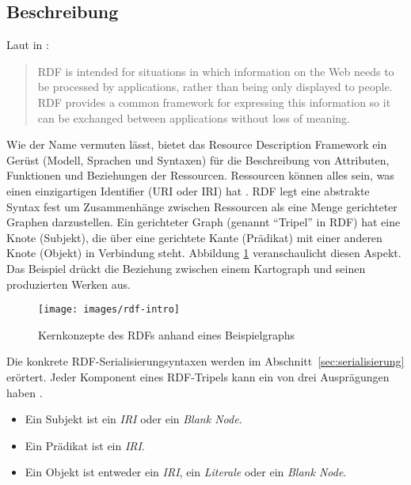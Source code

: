 \subsection{Beschreibung} 

Laut \citeauthor{Schreiber:14:RP} in : 

\hyphenblockquote{german}{RDF is intended for situations in which information on the Web needs to be processed by applications, rather than being only displayed to people. RDF provides a common framework for expressing this information so it can be exchanged between applications without loss of meaning.} 

Wie der Name vermuten lässt, bietet das Resource Description Framework ein Gerüst (Modell, Sprachen und Syntaxen) für die Beschreibung von Attributen, Funktionen und Beziehungen der Ressourcen. Ressourcen können alles sein, was einen einzigartigen Identifier (URI oder IRI) hat \parencite[vgl.][Folie~6]{Dekeyzer2013}. RDF legt eine abstrakte Syntax fest um Zusammenhänge zwischen Ressourcen als eine Menge gerichteter Graphen darzustellen. Ein gerichteter Graph (genannt \hyphenquote{german}{Tripel} in RDF) hat eine Knote (Subjekt), die über eine gerichtete Kante (Prädikat) mit einer anderen Knote (Objekt) in Verbindung steht. Abbildung \ref{fig:rdf-intro} veranschaulicht diesen Aspekt. Das Beispiel\footnotemark{} drückt die Beziehung zwischen einem Kartograph und seinen produzierten Werken aus. 

\begin{figure}[h]
	\centering
	\texttt{[image: images/rdf-intro]}
	\caption[Kernkonzepte des RDFs]{Kernkonzepte des RDFs anhand eines Beispielgraphs}
	\label{fig:rdf-intro}
\end{figure}

Die konkrete RDF-Serialisierungsyntaxen werden im Abschnitt~\ref{sec:serialisierung} erörtert. Jeder Komponent eines RDF-Tripels kann ein von drei Ausprägungen haben \parencite[vgl.][Abs.~3,1]{Wood:14:RCA}.

\begin{itemize}
	\item Ein Subjekt ist ein \textit{IRI} oder ein \textit{Blank Node}.
	\item Ein Prädikat ist ein \textit{IRI}.
	\item Ein Objekt ist entweder ein \textit{IRI}, ein \textit{Literale} oder ein \textit{Blank Node}.
\end{itemize}

